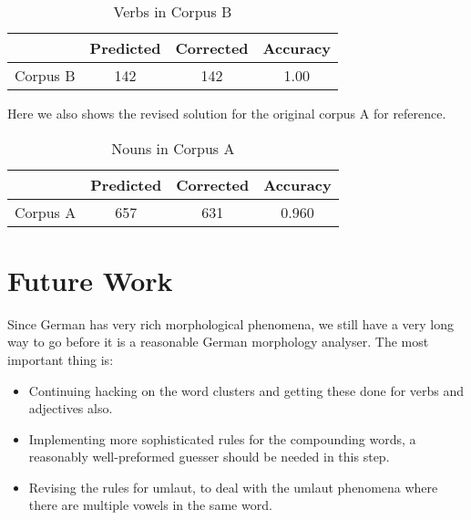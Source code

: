 \documentclass[11pt,letterpaper]{article}
\begin{document}
\begin{table}[h]
\begin{center}
\begin{tabular}{|c|ccc|}
\hline 
 & Predicted & Corrected & Accuracy \\ 
\hline 
Corpus B & 142 & 142 & 1.00 \\ 
\hline 
\end{tabular} 
\end{center}
\caption{Verbs in Corpus B}
\end{table}
Here we also shows the revised solution for the original corpus A for reference.
\begin{table}[h]
\begin{center}
\begin{tabular}{|c|ccc|}
\hline 
 & Predicted & Corrected & Accuracy \\ 
\hline 
Corpus A & 657 & 631 & 0.960 \\ 
\hline 
\end{tabular} 
\end{center}
\caption{Nouns in Corpus A}
\end{table}


\section{Future Work}
Since German has very rich morphological phenomena, we still have a very long way to go before it is a reasonable German morphology analyser. The most important thing is:
\begin{itemize}
\item Continuing hacking on the word clusters and getting these done for verbs and adjectives also.
\item Implementing more sophisticated rules for the compounding words, a reasonably well-preformed guesser should be needed in this step.
\item Revising the rules for umlaut, to deal with the umlaut phenomena where there are multiple vowels in the same word.
\end{itemize}

\newpage

\renewcommand\refname{References}




\label{lastpage}
\end{document}
